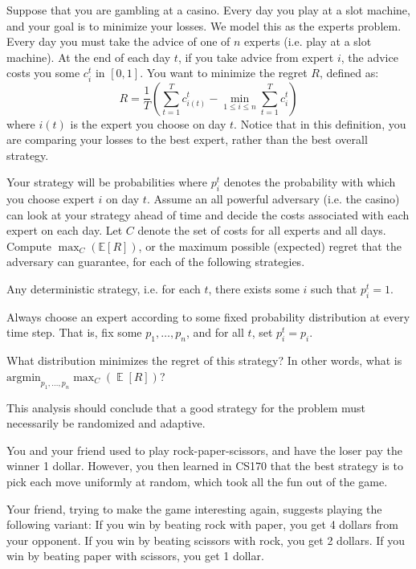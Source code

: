 \documentclass{article}
\begin{document}
Suppose that you are gambling at a casino. Every day you play at a slot machine, and your goal is to minimize your losses. We
model this as the experts problem. Every day you must take the advice
of one of $n$ experts (i.e. play at a slot machine). At the end of each day $t$, if you take advice from expert $i$, the advice costs you some $c_i^t$ in $[0,1]$.  You want to minimize the regret $R$, defined as:
$$R=\frac{1}{T}\left(\sum^{T}_{t=1}c^t_{i(t)} - \min_{1\leq i\leq n}  \sum^{T}_{t=1}c_i^t\right)$$  
where $i(t)$ is the expert you choose on day $t$. Notice that in this definition, you are comparing your losses to the best expert, rather than the best
overall strategy.

Your strategy will
be probabilities where $p_i^t$ denotes the probability with which you
choose expert $i$ on day $t$.  Assume an all powerful adversary
(i.e. the casino) can look at your strategy ahead of time and decide
the costs associated with each expert on each day. Let $C$ denote
the set of costs for all experts and all days. Compute $\max_C (\mathbb{E}[R])$, or the maximum
possible (expected) regret that the adversary can guarantee, for each
of the following strategies.

\begin{subparts}
 
\subpart Any deterministic strategy, i.e. for each
$t$, there exists some $i$ such that $p_i^t=1$.

\subpart Always choose an expert according to some fixed probability
distribution at every time step. That is, fix some $p_1,\ldots, p_n$,
and for all $t$, set $p_i^t=p_i$.

What distribution minimizes the regret of this strategy? In other words, what is \newline $\text{argmin}_{p_1,\ldots,p_n}\max_{C} (\mathop{\mathbb{E}}[R])$?\\
\end{subparts}

This analysis should conclude that a good strategy for the problem must necessarily be randomized and adaptive.


You and your friend used to play rock-paper-scissors, and have the loser pay the winner 1 dollar. However, you then learned in CS170 that the best strategy is to pick each move uniformly at random, which took all the fun out of the game.

Your friend, trying to make the game interesting again, suggests playing the following variant: If you win by beating rock with paper, you get 4 dollars from your opponent. If you win by beating scissors with rock, you get 2 dollars. If you win by beating paper with scissors, you get 1 dollar.
\end{document}

